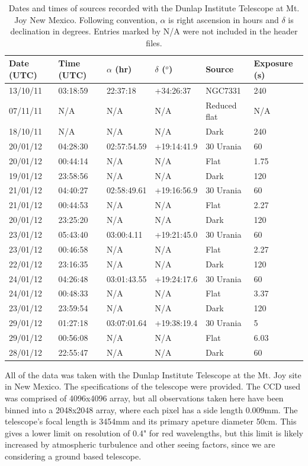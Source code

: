 \documentclass[a4paper,12pt]{article}
\begin{document}
\begin{table}[!htbp]
  \centering
  \begin{tabular}{l||l||l||l||l||l}
   Date (UTC) & Time (UTC) & $\alpha$ (hr) & $\delta$ ($^o$) & Source & Exposure (s)\\
   \hline
   13/10/11 & 03:18:59 & 22:37:18 & +34:26:37 & NGC7331 & 240\\
   07/11/11 & N/A & N/A & N/A & Reduced flat & N/A \\
   18/10/11 & N/A & N/A & N/A & Dark & 240\\
   \hline
   20/01/12 & 04:28:30 & 02:57:54.59 & +19:14:41.9 & 30 Urania & 60\\
   20/01/12 & 00:44:14 & N/A & N/A & Flat & 1.75\\
   19/01/12 & 23:58:56 & N/A & N/A & Dark & 120\\
   \hline
   21/01/12 & 04:40:27 & 02:58:49.61 & +19:16:56.9 & 30 Urania & 60\\
   21/01/12 & 00:44:53 & N/A & N/A & Flat & 2.27\\
   20/01/12 & 23:25:20 & N/A & N/A & Dark & 120\\
   \hline
   23/01/12 & 05:43:40 & 03:00:4.11 & +19:21:45.0 & 30 Urania & 60\\
   23/01/12 & 00:46:58 & N/A & N/A & Flat & 2.27\\
   22/01/12 & 23:16:35 & N/A & N/A & Dark & 120\\
   \hline
   24/01/12 & 04:26:48 & 03:01:43.55 & +19:24:17.6 & 30 Urania & 60\\
   24/01/12 & 00:48:33 & N/A & N/A & Flat & 3.37\\
   23/01/12 & 23:59:54 & N/A & N/A & Dark & 120\\
   \hline
   29/01/12 & 01:27:18 & 03:07:01.64 & +19:38:19.4 & 30 Urania & 5\\
   29/01/12 & 00:56:08 & N/A & N/A & Flat & 6.03\\
   28/01/12 & 22:55:47 & N/A & N/A & Dark & 60\\
   \end{tabular}
    \caption{Dates and times of sources recorded with the Dunlap Institute Telescope at Mt. Joy New Mexico. Following convention, $\alpha$ is right ascension in hours and $\delta$ is declination in degrees. Entries marked by N/A were not included in the header files.}
    \label{tab:datatable}
\end{table}

All of the data was taken with the Dunlap Institute Telescope at the Mt. Joy site in New Mexico. The specifications of the telescope were provided. The CCD used was comprised of 4096x4096 array, but all observations taken here have been binned into a 2048x2048 array, where each pixel has a side length 0.009mm. The telescope's focal length is 3454mm and its primary apeture diameter 50cm. This gives a lower limit on resolution of 0.4" for red wavelengths, but this limit is likely increased by atmospheric turbulence and other seeing factors, since we are considering a ground based telescope.
\end{document}
